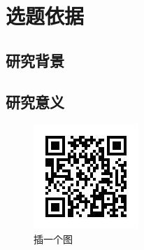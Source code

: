 \chapter{选题依据}

\section{研究背景}

\section{研究意义}

\begin{figure}[!h]
	\centering
	\includegraphics[width=.5\textwidth]{pic/question_survey.jpg}
	\caption{插一个图}
	\label{fig:survey_ques}
\end{figure}